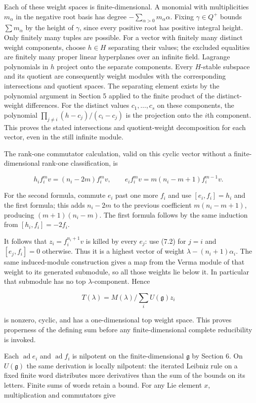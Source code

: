 \documentclass[11pt,a4paper,openany]{report}
\begin{document}
Each of these weight spaces is finite-dimensional. A monomial with multiplicities \(m_\alpha\) in the negative root basis has degree \(-\sum_{\alpha>0}m_\alpha\alpha\). Fixing \(\gamma\in Q^+\) bounds \(\sum m_\alpha\) by the height of \(\gamma\), since every positive root has positive integral height. Only finitely many tuples are possible. For a vector with finitely many distinct weight components, choose \(h\in H\) separating their values; the excluded equalities are finitely many proper linear hyperplanes over an infinite field. Lagrange polynomials in \(h\) project onto the separate components. Every \(H\)-stable subspace and its quotient are consequently weight modules with the corresponding intersections and quotient spaces. The separating element exists by the polynomial argument in Section 5 applied to the finite product of the distinct-weight differences. For the distinct values \(c_1,\ldots,c_s\) on these components, the polynomial \(\prod_{j\ne i}(h-c_j)/(c_i-c_j)\) is the projection onto the \(i\)th component. This proves the stated intersections and quotient-weight decomposition for each vector, even in the still infinite module.

The rank-one commutator calculation, valid on this cyclic vector without a finite-dimensional rank-one classification, is

\[
h_i f_i^m v=(n_i-2m)f_i^m v,
\qquad e_i f_i^m v=m(n_i-m+1)f_i^{m-1}v.
\tag{7.2}
\]

For the second formula, commute \(e_i\) past one more \(f_i\) and use \([e_i,f_i]=h_i\) and the first formula; this adds \(n_i-2m\) to the previous coefficient \(m(n_i-m+1)\), producing \((m+1)(n_i-m)\). The first formula follows by the same induction from \([h_i,f_i]=-2f_i\).

It follows that \(z_i=f_i^{n_i+1}v\) is killed by every \(e_j\): use (7.2) for \(j=i\) and \([e_j,f_i]=0\) otherwise. Thus it is a highest vector of weight \(\lambda-(n_i+1)\alpha_i\). The same induced-module construction gives a map from the Verma module of that weight to its generated submodule, so all those weights lie below it. In particular that submodule has no top \(\lambda\)-component. Hence

\[
T(\lambda)=M(\lambda)/\sum_i U(\mathfrak g)z_i
\tag{7.3}
\]

is nonzero, cyclic, and has a one-dimensional top weight space. This proves properness of the defining sum before any finite-dimensional complete reducibility is invoked.

Each \(\operatorname{ad}e_i\) and \(\operatorname{ad}f_i\) is nilpotent on the finite-dimensional \(\mathfrak g\) by Section 6. On \(U(\mathfrak g)\) the same derivation is locally nilpotent: the iterated Leibniz rule on a fixed finite word distributes more derivatives than the sum of the bounds on its letters. Finite sums of words retain a bound. For any Lie element \(x\), multiplication and commutators give
\end{document}
